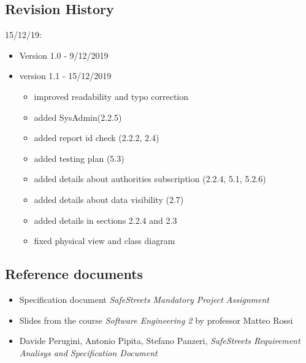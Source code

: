 \subsection{Revision History}
15/12/19:
\begin{itemize}
	\item Version 1.0 - 9/12/2019
	\item version 1.1 - 15/12/2019
	\begin{itemize}
		\item improved readability and typo correction
		\item added SysAdmin(2.2.5)
		\item added report id check (2.2.2, 2.4)
		\item added testing plan (5.3)
		\item added details about authorities subscription (2.2.4, 5.1, 5.2.6)
		\item added details about data visibility (2.7)
		\item added details in sections 2.2.4 and 2.3
		\item fixed physical view and class diagram
	\end{itemize}
\end{itemize}
\subsection{Reference documents}
\begin{itemize}
	\item Specification document \textit{SafeStreets Mandatory Project Assignment} 
	\item Slides from the course \textit{Software Engineering 2} by professor Matteo Rossi 
	\item Davide Perugini, Antonio Pipita, Stefano Panzeri, \textit{SafeStreets Requirement Analisys and Specification Document}
\end{itemize}
